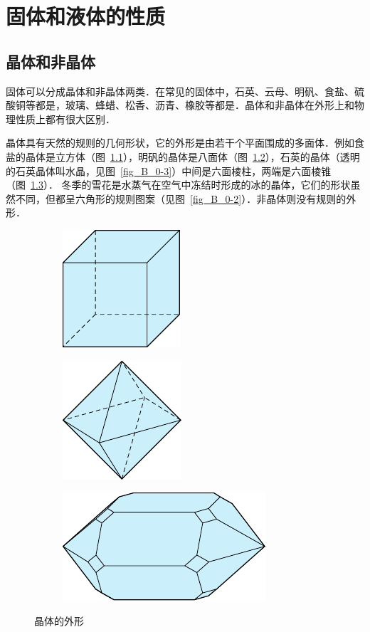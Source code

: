 \chapter{固体和液体的性质}\label{chapter-properties-of-solids-and-liquids}

\section{晶体和非晶体}
固体可以分成晶体和非晶体两类．在常见的固体中，石英、云母、明矾、食盐、硫酸铜等都是，玻璃、蜂蜡、松香、沥青、橡胶等都是．晶体和非晶体在外形上和物理性质上都有很大区别．

晶体具有天然的规则的几何形状，它的外形是由若干个平面围成的多面体．例如食盐的晶体是立方体（图~\ref{fig_B_4-1a}），明矾的晶体是八面体（图~\ref{fig_B_4-1b}），石英的晶体（透明的石英晶体叫水晶，见图~\ref{fig_B_0-3}）中间是六面棱柱，两端是六面棱锥（图~\ref{fig_B_4-1c}）．
冬季的雪花是水蒸气在空气中冻结时形成的冰的晶体，它们的形状虽然不同，但都呈六角形的规则图案（见图~\ref{fig_B_0-2}）．非晶体则没有规则的外形．

\begin{figure}[htbp]
	\centering
	\begin{subfigure}{0.3\linewidth}
		\centering
		\includegraphics{fig/B/4-1a.pdf}
		\caption{}\label{fig_B_4-1a}
	\end{subfigure}
	\hfil
	\begin{subfigure}{0.3\linewidth}
		\centering
		\includegraphics{fig/B/4-1b.pdf}
		\caption{}\label{fig_B_4-1b}
	\end{subfigure}
	\hfil
	\begin{subfigure}{0.3\linewidth}
		\centering
		\includegraphics{fig/B/4-1c.pdf}
		\caption{}\label{fig_B_4-1c}
	\end{subfigure}
	\caption{晶体的外形}\label{fig_B_4-1}
\end{figure}



